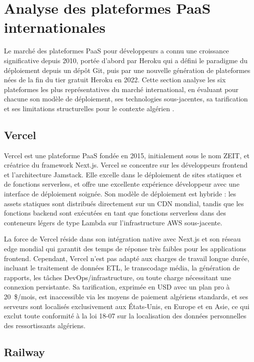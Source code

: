 \section{Analyse des plateformes PaaS internationales}

Le marché des plateformes PaaS pour développeurs a connu une croissance significative depuis 2010, portée d'abord par Heroku qui a défini le paradigme du déploiement depuis un dépôt Git, puis par une nouvelle génération de plateformes nées de la fin du tier gratuit Heroku en 2022. Cette section analyse les six plateformes les plus représentatives du marché international, en évaluant pour chacune son modèle de déploiement, ses technologies sous-jacentes, sa tarification et ses limitations structurelles pour le contexte algérien \cite{paas-comparison}.

\subsection*{Vercel}

Vercel est une plateforme PaaS fondée en 2015, initialement sous le nom ZEIT, et créatrice du framework Next.js. Vercel se concentre sur les développeurs frontend et l'architecture Jamstack. Elle excelle dans le déploiement de sites statiques et de fonctions serverless, et offre une excellente expérience développeur avec une interface de déploiement soignée.  Son modèle de déploiement est hybride : les assets statiques sont distribués directement sur un CDN mondial, tandis que les fonctions backend sont exécutées en tant que fonctions serverless dans des conteneurs légers de type Lambda sur l'infrastructure AWS sous-jacente.

La force de Vercel réside dans son intégration native avec Next.js et son réseau edge mondial qui garantit des temps de réponse très faibles pour les applications frontend. Cependant, Vercel n'est pas adapté aux charges de travail longue durée, incluant le traitement de données ETL, le transcodage média, la génération de rapports, les tâches DevOps/infrastructure, ou toute charge nécessitant une connexion persistante.  Sa tarification, exprimée en USD avec un plan pro à 20~\$/mois, est inaccessible via les moyens de paiement algériens standards, et ses serveurs sont localisés exclusivement aux États-Unis, en Europe et en Asie, ce qui exclut toute conformité à la loi 18-07 sur la localisation des données personnelles des ressortissants algériens.

\subsection*{Railway}


